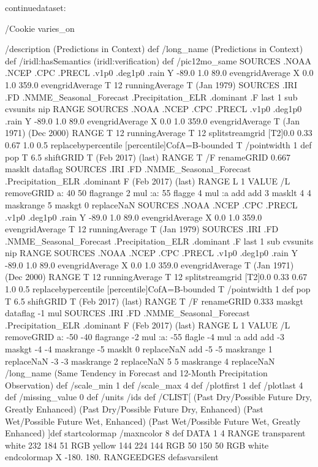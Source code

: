 \begin{ingrid}

continuedataset:


/Cookie varies_on

/description (Predictions in Context) def
/long_name (Predictions in Context) def
/iridl:hasSemantics (iridl:verification) def
/pic12mo_same {
 SOURCES .NOAA .NCEP .CPC .PRECL .v1p0 .deg1p0 .rain
  Y -89.0 1.0 89.0 evengridAverage
  X 0.0 1.0 359.0 evengridAverage
  T 12 runningAverage
  T (Jan 1979) SOURCES .IRI .FD .NMME_Seasonal_Forecast .Precipitation_ELR .dominant .F
     last
      1 sub
      cvsunits nip RANGE
  SOURCES .NOAA .NCEP .CPC .PRECL .v1p0 .deg1p0 .rain
   Y -89.0 1.0 89.0 evengridAverage
   X 0.0 1.0 359.0 evengridAverage
   T (Jan 1971) (Dec 2000) RANGE
   T 12 runningAverage
   T 12 splitstreamgrid
   [T2]0.0 0.33 0.67 1.0 0.5 replacebypercentile
   [percentile]CofA=B-bounded
  T
   /pointwidth 1 def
   pop
  T 6.5 shiftGRID
  T (Feb 2017) (last) RANGE
  T /F renameGRID
  0.667 masklt
  dataflag
  SOURCES .IRI .FD .NMME_Seasonal_Forecast .Precipitation_ELR .dominant
   F (Feb 2017) (last) RANGE
   L 1 VALUE
   /L removeGRID
   a:
     40 50 flagrange
     2 mul
     :a:
      55 flagge
      4 mul
      :a
    add
   add
  3 masklt
  4 4 maskrange
  5 maskgt
  0 replaceNaN
  SOURCES .NOAA .NCEP .CPC .PRECL .v1p0 .deg1p0 .rain
   Y -89.0 1.0 89.0 evengridAverage
   X 0.0 1.0 359.0 evengridAverage
   T 12 runningAverage
   T (Jan 1979) SOURCES .IRI .FD .NMME_Seasonal_Forecast .Precipitation_ELR .dominant .F
      last
       1 sub
       cvsunits nip RANGE
   SOURCES .NOAA .NCEP .CPC .PRECL .v1p0 .deg1p0 .rain
    Y -89.0 1.0 89.0 evengridAverage
    X 0.0 1.0 359.0 evengridAverage
    T (Jan 1971) (Dec 2000) RANGE
    T 12 runningAverage
    T 12 splitstreamgrid
    [T2]0.0 0.33 0.67 1.0 0.5 replacebypercentile
    [percentile]CofA=B-bounded
   T
    /pointwidth 1 def
    pop
   T 6.5 shiftGRID
   T (Feb 2017) (last) RANGE
   T /F renameGRID
   0.333 maskgt
   dataflag
   -1 mul
   SOURCES .IRI .FD .NMME_Seasonal_Forecast .Precipitation_ELR .dominant
    F (Feb 2017) (last) RANGE
    L 1 VALUE
    /L removeGRID
    a:
      -50 -40 flagrange
      -2 mul
      :a:
       -55 flagle
       -4 mul
       :a
     add
    add
   -3 maskgt
   -4 -4 maskrange
   -5 masklt
   0 replaceNaN
   add
  -5 -5 maskrange
  1 replaceNaN
  -3 -3 maskrange
  2 replaceNaN
  5 5 maskrange
  4 replaceNaN
  /long_name (Same Tendency in Forecast and 12-Month Precipitation Observation) def
  /scale_min 1 def
  /scale_max 4 def
  /plotfirst 1 def
  /plotlast 4 def
  /missing_value 0 def
  /units /ids def
  /CLIST[ (Past Dry/Possible Future Dry, Greatly Enhanced) (Past Dry/Possible Future Dry, Enhanced) (Past Wet/Possible Future Wet, Enhanced) (Past Wet/Possible Future Wet, Greatly Enhanced) ]def
  startcolormap
    /maxncolor 8 def
    DATA
    1 4 RANGE
    transparent white 232
       184 51 RGB
       yellow 144
         224 144 RGB
         50
          150 50 RGB
          white endcolormap
X -180. 180. RANGEEDGES
} defasvarsilent
\end{ingrid}
